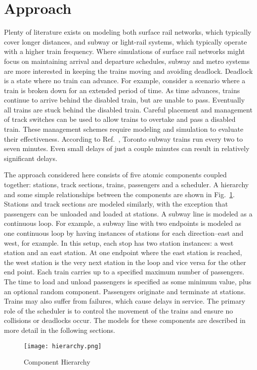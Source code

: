 \section{Approach}
Plenty of literature exists on modeling both surface rail networks, which typically cover longer distances, and subway or light-rail systems, which typically operate with a higher train frequency. Where simulations of surface rail networks might focus on maintaining arrival and departure schedules, subway and metro systems are more interested in keeping the trains moving and avoiding deadlock.  Deadlock is a state where no train can advance.  For example, consider a scenario where a train is broken down for an extended period of time.  As time advances, trains continue to arrive behind the disabled train, but are unable to pass.  Eventually all trains are stuck behind the disabled train.  Careful placement and management of track switches can be used to allow trains to overtake and pass a disabled train. These management schemes require modeling and simulation to evaluate their effectiveness.  According to Ref.~, Toronto subway trains run every two to seven minutes. Even small delays of just a couple minutes can result in relatively significant delays.

The approach considered here consists of five atomic components coupled together: stations, track sections, trains, passengers and a scheduler. A hierarchy and some simple relationships between the components are shown in Fig.~\ref{fig:hierarchy}.  Stations and track sections are modeled similarly, with the exception that passengers can be unloaded and loaded at stations. A subway line is modeled as a continuous loop. For example, a subway line with two endpoints is modeled as one continuous loop by having instances of stations for each direction--east and west, for example. In this setup, each stop has two station instances: a west station and an east station.  At one endpoint where the east station is reached, the west station is the very next station in the loop and vice versa for the other end point.  Each train carries up to a specified maximum number of passengers. The time to load and unload passengers is specified as some minimum value, plus an optional random component. Passengers originate and terminate at stations.  Trains may also suffer from failures, which cause delays in service.  The primary role of the scheduler is to control the movement of the trains and ensure no collisions or deadlocks occur.  The models for these components are described in more detail in the following sections.
%
\begin{figure}[htb]
	\centering
	\texttt{[image: hierarchy.png]}
	\caption{Component Hierarchy}
	\label{fig:hierarchy}
\end{figure}
%
